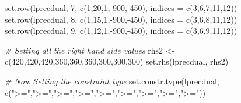 \documentclass[
]{article}
\newenvironment{Shaded}{\begin{snugshade}}{\end{snugshade}}
\newcommand{\AttributeTok}[1]{\textcolor[rgb]{0.77,0.63,0.00}{#1}}
\newcommand{\CommentTok}[1]{\textcolor[rgb]{0.56,0.35,0.01}{\textit{#1}}}
\newcommand{\DecValTok}[1]{\textcolor[rgb]{0.00,0.00,0.81}{#1}}
\newcommand{\FunctionTok}[1]{\textcolor[rgb]{0.00,0.00,0.00}{#1}}
\newcommand{\NormalTok}[1]{#1}
\newcommand{\OtherTok}[1]{\textcolor[rgb]{0.56,0.35,0.01}{#1}}
\newcommand{\SpecialCharTok}[1]{\textcolor[rgb]{0.00,0.00,0.00}{#1}}
\newcommand{\StringTok}[1]{\textcolor[rgb]{0.31,0.60,0.02}{#1}}
\begin{document}
\begin{Shaded}
\begin{Highlighting}[]
\FunctionTok{set.row}\NormalTok{(lprecdual, }\DecValTok{7}\NormalTok{, }\FunctionTok{c}\NormalTok{(}\DecValTok{1}\NormalTok{,}\DecValTok{20}\NormalTok{,}\DecValTok{1}\NormalTok{,}\SpecialCharTok{{-}}\DecValTok{900}\NormalTok{,}\SpecialCharTok{{-}}\DecValTok{450}\NormalTok{), }\AttributeTok{indices =} \FunctionTok{c}\NormalTok{(}\DecValTok{3}\NormalTok{,}\DecValTok{6}\NormalTok{,}\DecValTok{7}\NormalTok{,}\DecValTok{11}\NormalTok{,}\DecValTok{12}\NormalTok{))}
\FunctionTok{set.row}\NormalTok{(lprecdual, }\DecValTok{8}\NormalTok{, }\FunctionTok{c}\NormalTok{(}\DecValTok{1}\NormalTok{,}\DecValTok{15}\NormalTok{,}\DecValTok{1}\NormalTok{,}\SpecialCharTok{{-}}\DecValTok{900}\NormalTok{,}\SpecialCharTok{{-}}\DecValTok{450}\NormalTok{), }\AttributeTok{indices =} \FunctionTok{c}\NormalTok{(}\DecValTok{3}\NormalTok{,}\DecValTok{6}\NormalTok{,}\DecValTok{8}\NormalTok{,}\DecValTok{11}\NormalTok{,}\DecValTok{12}\NormalTok{))}
\FunctionTok{set.row}\NormalTok{(lprecdual, }\DecValTok{9}\NormalTok{, }\FunctionTok{c}\NormalTok{(}\DecValTok{1}\NormalTok{,}\DecValTok{12}\NormalTok{,}\DecValTok{1}\NormalTok{,}\SpecialCharTok{{-}}\DecValTok{900}\NormalTok{,}\SpecialCharTok{{-}}\DecValTok{450}\NormalTok{), }\AttributeTok{indices =} \FunctionTok{c}\NormalTok{(}\DecValTok{3}\NormalTok{,}\DecValTok{6}\NormalTok{,}\DecValTok{9}\NormalTok{,}\DecValTok{11}\NormalTok{,}\DecValTok{12}\NormalTok{))}
\end{Highlighting}
\end{Shaded}

\begin{Shaded}
\begin{Highlighting}[]
\CommentTok{\# Setting all the right hand side values}
\NormalTok{rhs2 }\OtherTok{\textless{}{-}} \FunctionTok{c}\NormalTok{(}\DecValTok{420}\NormalTok{,}\DecValTok{420}\NormalTok{,}\DecValTok{420}\NormalTok{,}\DecValTok{360}\NormalTok{,}\DecValTok{360}\NormalTok{,}\DecValTok{360}\NormalTok{,}\DecValTok{300}\NormalTok{,}\DecValTok{300}\NormalTok{,}\DecValTok{300}\NormalTok{)}
\FunctionTok{set.rhs}\NormalTok{(lprecdual, rhs2)}
\end{Highlighting}
\end{Shaded}

\begin{Shaded}
\begin{Highlighting}[]
\CommentTok{\# Now Setting the constraint type}
\FunctionTok{set.constr.type}\NormalTok{(lprecdual, }\FunctionTok{c}\NormalTok{(}\StringTok{"\textgreater{}="}\NormalTok{,}\StringTok{"\textgreater{}="}\NormalTok{,}\StringTok{"\textgreater{}="}\NormalTok{,}\StringTok{"\textgreater{}="}\NormalTok{,}\StringTok{"\textgreater{}="}\NormalTok{,}\StringTok{"\textgreater{}="}\NormalTok{,}\StringTok{"\textgreater{}="}\NormalTok{,}\StringTok{"\textgreater{}="}\NormalTok{,}\StringTok{"\textgreater{}="}\NormalTok{))}
\end{Highlighting}
\end{Shaded}
\end{document}
